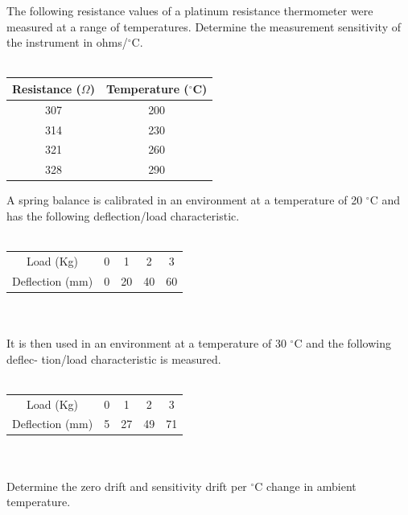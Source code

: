 \documentclass[a4paper,11pt]{book}
\begin{document}
\begin{question}
The following resistance values of a platinum resistance thermometer were measured at a range
of temperatures.
 Determine the measurement sensitivity of the instrument in ohms/$^{\circ}$C. \\ \\
\begin{tabular}{cc}
\hline 
Resistance ($\Omega$) & Temperature ($^{\circ}$C) \\ 
\hline 
307 & 200 \\ 
314 & 230 \\ 
321 & 260 \\ 
328 & 290 \\ 
\end{tabular} 
\examspace*{5em}

\end{question}
\begin{solution}


\end{solution}


\begin{question}
A spring balance is calibrated in an environment at a temperature of 20 $^{\circ}$C and has the
following deflection/load characteristic. \\ \\

\begin{tabular}{ccccc}
\hline 
Load (Kg) & 0 & 1 & 2 & 3 \\ 
Deflection (mm) & 0 & 20 & 40 & 60 \\ 
\hline 
\end{tabular}  \\ \\

It is then used in an environment at a temperature of 30 $^{\circ}$C and the following deflec-
tion/load characteristic is measured. \\ \\

\begin{tabular}{ccccc}
\hline 
Load (Kg) & 0 & 1 & 2 & 3 \\ 
Deflection (mm) & 5 & 27 & 49 & 71 \\ 
\hline 
\end{tabular}  \\ \\


Determine the zero drift and sensitivity drift per $^{\circ}$C change in ambient temperature.


\examspace*{5em}

\end{question}
\begin{solution}


\end{solution}
\end{document}
